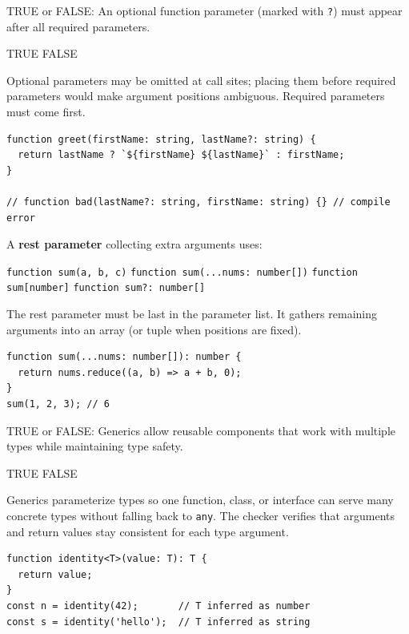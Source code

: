 \newpage




\question[4]
TRUE or FALSE: An optional function parameter (marked with \lstinline[style=tsinline]|?|) must appear after all required parameters.
\begin{choices}
  \CorrectChoice TRUE
  \choice FALSE
\end{choices}
\begin{solution}
  Optional parameters may be omitted at call sites; placing them before required parameters would make argument positions ambiguous. Required parameters must come first.
\begin{lstlisting}[style=ts]
function greet(firstName: string, lastName?: string) {
  return lastName ? `${firstName} ${lastName}` : firstName;
}

// function bad(lastName?: string, firstName: string) {} // compile error
\end{lstlisting}
\end{solution}

\question[4]
A \textbf{rest parameter} collecting extra arguments uses:
\begin{choices}
  \choice \lstinline[style=tsinline]|function sum(a, b, c)|
  \CorrectChoice \lstinline[style=tsinline]|function sum(...nums: number[])|
  \choice \lstinline[style=tsinline]|function sum[number]|
  \choice \lstinline[style=tsinline]|function sum?: number[]|
\end{choices}
\begin{solution}
  The rest parameter must be last in the parameter list. It gathers remaining arguments into an array (or tuple when positions are fixed).
\begin{lstlisting}[style=ts]
function sum(...nums: number[]): number {
  return nums.reduce((a, b) => a + b, 0);
}
sum(1, 2, 3); // 6
\end{lstlisting}
\end{solution}

\question[4]
TRUE or FALSE: Generics allow reusable components that work with multiple types while maintaining type safety.
\begin{choices}
  \CorrectChoice TRUE
  \choice FALSE
\end{choices}
\begin{solution}
  Generics parameterize types so one function, class, or interface can serve many concrete types without falling back to \lstinline[style=tsinline]|any|. The checker verifies that arguments and return values stay consistent for each type argument.
\begin{lstlisting}[style=ts]
function identity<T>(value: T): T {
  return value;
}
const n = identity(42);       // T inferred as number
const s = identity('hello');  // T inferred as string
\end{lstlisting}
\end{solution}



